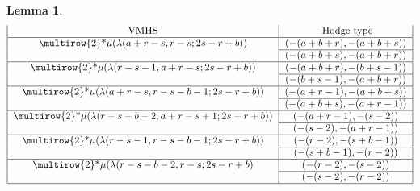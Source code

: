 \documentclass[11pt, a4paper]{amsart}
\theoremstyle{plain}
\newtheorem{lemma}[theorem]{Lemma}
\theoremstyle{definition}
\numberwithin{equation}{section}
\begin{document}
\begin{lemma}
\begin{equation}
\begin{tabular}{|c|c|}
            \text{VMHS} & \text{ Hodge type} \\
            \hline 
            \multirow{2}*{$\mu(\lambda(a + r - s, r - s; 2s - r + b))$} & $(-(a + b + r), -(a + b + s))$ \\
            \cline{2-2}
            ~ & $(-(a + b + s), -(a + b + r))$ \\
            \hline 
            \multirow{2}*{$\mu(\lambda(r - s - 1, a + r -s; 2s - r + b))$} & $(-(a + b + r), -(b + s - 1))$ \\
            \cline{2-2}
            ~ & $(-(b + s - 1), -(a + b + r))$ \\
            \hline 
            \multirow{2}*{$\mu(\lambda(a + r - s, r - s - b - 1; 2s - r + b))$} & $(-(a + r - 1), -(a + b + s))$ \\ 
            \cline{2-2}
            ~ & $(-(a + b + s), -(a + r - 1))$\\
            \hline 
            \multirow{2}*{$\mu(\lambda(r - s - b - 2, a + r - s + 1; 2s - r + b))$} & $(-(a + r - 1), -(s - 2))$ \\ 
            \cline{2-2}
            ~ & $(-(s - 2), -(a + r - 1))$ \\
            \hline 
            \multirow{2}*{$\mu(\lambda(r - s - 1, r - s - b - 1; 2s - r + b))$} & $(-(r - 2), -(s + b - 1))$ \\
            \cline{2-2}
            ~ & $(-(s + b - 1), -(r - 2))$ \\
            \hline 
            \multirow{2}*{$\mu(\lambda(r - s - b - 2, r - s; 2s - r + b)$} & $(-(r - 2), -(s - 2))$ \\ 
            \cline{2-2}
            ~ & $(-(s - 2), -(r - 2))$ \\
            \hline 
            \end{tabular}
    \end{equation}
\end{lemma}
\end{document}
